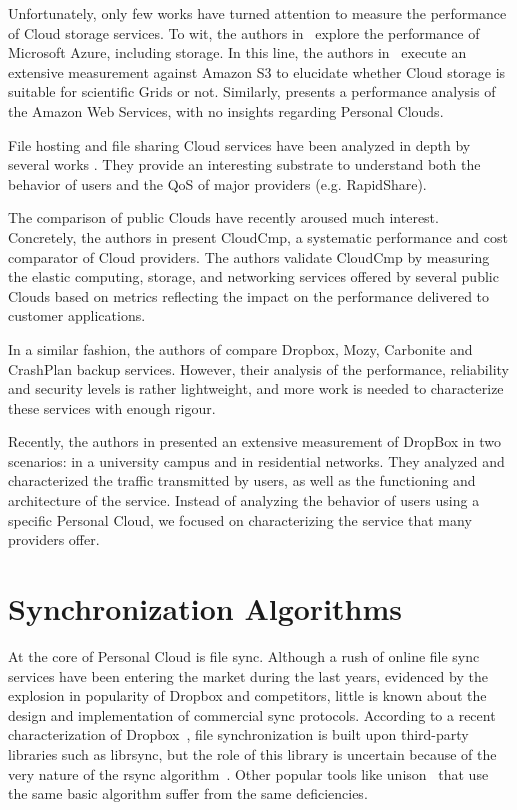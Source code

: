 Unfortunately, only few works have turned attention to measure the performance
of Cloud storage services. To wit, the authors in~\cite{early_experiences_azure}
explore the performance of Microsoft Azure,
including storage. In this line, the authors in~\cite{s3_grids} execute an extensive
measurement against Amazon S3 to elucidate whether Cloud storage is suitable
for scientific Grids or not.
Similarly, \cite{bergen2011client} presents a performance 
analysis of the Amazon Web Services, with no
insights regarding Personal Clouds.

File hosting and file sharing Cloud services have been analyzed in depth
by several works \cite{imc_rapidshare, one_click_hosting}.
They provide an interesting substrate to understand both
the behavior of users and the QoS of major providers (e.g. RapidShare).

The comparison of public Clouds have recently aroused much
interest. Concretely, the authors in \cite{cloudcmp} present CloudCmp, a systematic
performance and cost comparator of Cloud providers.
The authors validate CloudCmp by measuring the elastic computing, 
storage, and networking services offered by several
public Clouds based on metrics reflecting the impact 
on the performance delivered to customer applications.

In a similar fashion, the authors of \cite{hu2010good} compare Dropbox, Mozy, 
Carbonite and CrashPlan backup services. However, their analysis of 
the performance, reliability and security levels is rather lightweight, and
more work is needed to characterize these services with enough rigour.

Recently, the authors in \cite{drago2012inside} presented an
extensive measurement of DropBox in two scenarios: in a university
campus and in residential networks. They analyzed and characterized the 
traffic transmitted by users, as well as the
functioning and architecture of the service. Instead of analyzing the behavior
of users using a specific Personal Cloud, we focused on
characterizing the service that many providers offer.

\section{Synchronization Algorithms}

At the core of Personal Cloud is file sync. Although a rush of online file sync services have
been entering the market during the last years, evidenced by the explosion in popularity of
Dropbox and competitors, little is known about the design and implementation of commercial
sync protocols. According to a recent characterization of Dropbox~\cite{drago2012inside}, file synchronization
is built upon third-party libraries such as librsync, but the role of this library is uncertain
because of the very nature of the rsync algorithm~\cite{tridgell96rsync}. Other popular tools like 
unison~\cite{unison} that use the same basic algorithm suffer from the same deficiencies.

